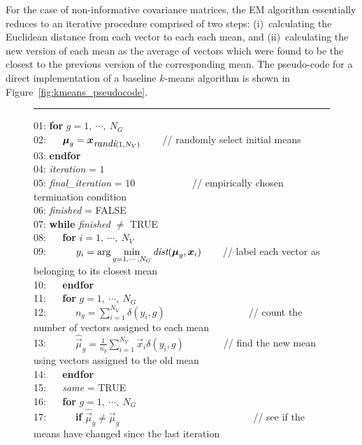 For the case of non-informative covariance matrices, the EM algorithm essentially reduces to an iterative procedure comprised of two steps:
(i)~calculating the Euclidean distance from each vector to each each mean,
and
(ii)~calculating the new version of each mean as the average of vectors which were found to be the closest to the previous version of the corresponding mean.
The pseudo-code for a direct implementation of a baseline $k$-means algorithm is shown in Figure~\ref{fig:kmeans_pseudocode}.

\begin{figure}[!b]
\hrule
\vspace{0.5ex}
\begin{small}
\begin{tabbing}
01: {\bf for} $g=1, ~\cdots, ~N_G$ \\
02: ~~ $\Vec{\mu}_g = \Vec{x}_{ \mbox{\it randi}(1, N_V) } $ ~~~ {\small // randomly select initial means} \\
03: {\bf endfor} \\
04: {\it iteration} = $1$ \\
05: {\it final\_iteration} = $10$ ~~~ ~~~ ~~~ {\small // empirically chosen termination condition} \\
06: {\it finished} = FALSE \\
07: {\bf while} {\it finished} $\neq$ TRUE \\
08: ~~ {\bf for} $i=1, ~\cdots, ~N_V$ \\
09: ~~ ~~ \( y_i = {\displaystyle \arg \min_{g=1, \cdots, N_G}} \operatorname{\mbox{\it dist}}(\Vec{\mu}_g, \Vec{x}_i) \) ~~~ {\small // label each vector as belonging to its closest mean} \\
10: ~~ {\bf endfor} \\
11: ~~ {\bf for} $g=1, ~\cdots, ~N_G$ \\
12: ~~ ~~ $n_g = \sum\nolimits_{i=1}^{N_V} \delta(y_i, g) $  ~~~ ~~~ ~~~ ~~~ ~ {\small // count the number of vectors assigned to each mean} \\
13: ~~ ~~ $\widehat{\Vec{\mu}}_g = \frac{1}{n_g} \sum\nolimits_{i=1}^{N_V} \Vec{x}_i \delta(y_i, g) $ ~~~ ~~~ {\small // find the new mean using vectors assigned to the old mean} \\
14: ~~ {\bf endfor} \\
15: ~~ {\it same} = TRUE \\
16: ~~ {\bf for} $g=1, ~\cdots, ~N_G$ \\
17: ~~ ~~ {\bf if} $\widehat{\Vec{\mu}}_g \neq \Vec{\mu}_g $  ~~~ ~~~ ~~~ ~~~ ~~~ ~~~ ~~~~ {\small // see if the means have changed since the last iteration} \\

\end{tabbing}
\end{small}
\end{figure}
